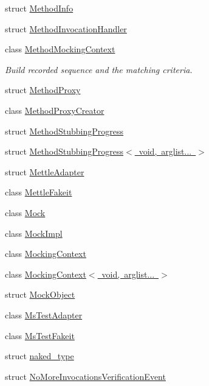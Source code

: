 \begin{DoxyCompactItemize}
\item 
struct \mbox{\hyperlink{structfakeit_1_1MethodInfo}{Method\+Info}}
\item 
struct \mbox{\hyperlink{structfakeit_1_1MethodInvocationHandler}{Method\+Invocation\+Handler}}
\item 
class \mbox{\hyperlink{classfakeit_1_1MethodMockingContext}{Method\+Mocking\+Context}}
\begin{DoxyCompactList}\small\item\em Build recorded sequence and the matching criteria. \end{DoxyCompactList}\item 
struct \mbox{\hyperlink{structfakeit_1_1MethodProxy}{Method\+Proxy}}
\item 
class \mbox{\hyperlink{classfakeit_1_1MethodProxyCreator}{Method\+Proxy\+Creator}}
\item 
struct \mbox{\hyperlink{structfakeit_1_1MethodStubbingProgress}{Method\+Stubbing\+Progress}}
\item 
struct \mbox{\hyperlink{structfakeit_1_1MethodStubbingProgress_3_01void_00_01arglist_8_8_8_01_4}{Method\+Stubbing\+Progress$<$ void, arglist... $>$}}
\item 
struct \mbox{\hyperlink{structfakeit_1_1MettleAdapter}{Mettle\+Adapter}}
\item 
class \mbox{\hyperlink{classfakeit_1_1MettleFakeit}{Mettle\+Fakeit}}
\item 
class \mbox{\hyperlink{classfakeit_1_1Mock}{Mock}}
\item 
class \mbox{\hyperlink{classfakeit_1_1MockImpl}{Mock\+Impl}}
\item 
class \mbox{\hyperlink{classfakeit_1_1MockingContext}{Mocking\+Context}}
\item 
class \mbox{\hyperlink{classfakeit_1_1MockingContext_3_01void_00_01arglist_8_8_8_01_4}{Mocking\+Context$<$ void, arglist... $>$}}
\item 
struct \mbox{\hyperlink{structfakeit_1_1MockObject}{Mock\+Object}}
\item 
class \mbox{\hyperlink{classfakeit_1_1MsTestAdapter}{Ms\+Test\+Adapter}}
\item 
class \mbox{\hyperlink{classfakeit_1_1MsTestFakeit}{Ms\+Test\+Fakeit}}
\item 
struct \mbox{\hyperlink{structfakeit_1_1naked__type}{naked\+\_\+type}}
\item 
struct \mbox{\hyperlink{structfakeit_1_1NoMoreInvocationsVerificationEvent}{No\+More\+Invocations\+Verification\+Event}}
\item 

\end{DoxyCompactItemize}
